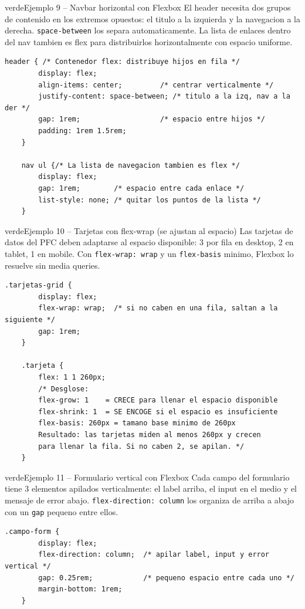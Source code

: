 \documentclass[11pt,a4paper]{article}
\begin{document}
	\begin{cajacodigo}{verde}{Ejemplo 9 -- Navbar horizontal con Flexbox}
		{\color{codigotexto}\small El header necesita dos grupos de contenido en los extremos opuestos: el titulo a la izquierda y la navegacion a la derecha. \texttt{space-between} los separa automaticamente. La lista de enlaces dentro del nav tambien es flex para distribuirlos horizontalmente con espacio uniforme.}
		
		\begin{lstlisting}[style=codecss]
	header { /* Contenedor flex: distribuye hijos en fila */
		display: flex;
		align-items: center;         /* centrar verticalmente */
		justify-content: space-between; /* titulo a la izq, nav a la der */
		gap: 1rem;                   /* espacio entre hijos */
		padding: 1rem 1.5rem;
	}
	
	nav ul {/* La lista de navegacion tambien es flex */
		display: flex;
		gap: 1rem;        /* espacio entre cada enlace */
		list-style: none; /* quitar los puntos de la lista */
	} \end{lstlisting}
	\end{cajacodigo}
	
	\begin{cajacodigo}{verde}{Ejemplo 10 -- Tarjetas con flex-wrap (se ajustan al espacio)}
		{\color{codigotexto}\small Las tarjetas de datos del PFC deben adaptarse al espacio disponible: 3 por fila en desktop, 2 en tablet, 1 en mobile. Con \texttt{flex-wrap: wrap} y un \texttt{flex-basis} minimo, Flexbox lo resuelve sin media queries.}
		\begin{lstlisting}[style=codecss]
	.tarjetas-grid {
		display: flex;
		flex-wrap: wrap;  /* si no caben en una fila, saltan a la siguiente */
		gap: 1rem;
	}
	
	.tarjeta {
		flex: 1 1 260px;
		/* Desglose:
		flex-grow: 1    = CRECE para llenar el espacio disponible
		flex-shrink: 1  = SE ENCOGE si el espacio es insuficiente
		flex-basis: 260px = tamano base minimo de 260px
		Resultado: las tarjetas miden al menos 260px y crecen
		para llenar la fila. Si no caben 2, se apilan. */
	} \end{lstlisting}
	\end{cajacodigo}
	
	\begin{cajacodigo}{verde}{Ejemplo 11 -- Formulario vertical con Flexbox}
		{\color{codigotexto}\small Cada campo del formulario tiene 3 elementos apilados verticalmente: el label arriba, el input en el medio y el mensaje de error abajo. \texttt{flex-direction: column} los organiza de arriba a abajo con un \texttt{gap} pequeno entre ellos.}
		\begin{lstlisting}[style=codecss]
	.campo-form {
		display: flex;
		flex-direction: column;  /* apilar label, input y error vertical */
		gap: 0.25rem;            /* pequeno espacio entre cada uno */
		margin-bottom: 1rem;
	} \end{lstlisting}
	\end{cajacodigo}
	
\end{document}
